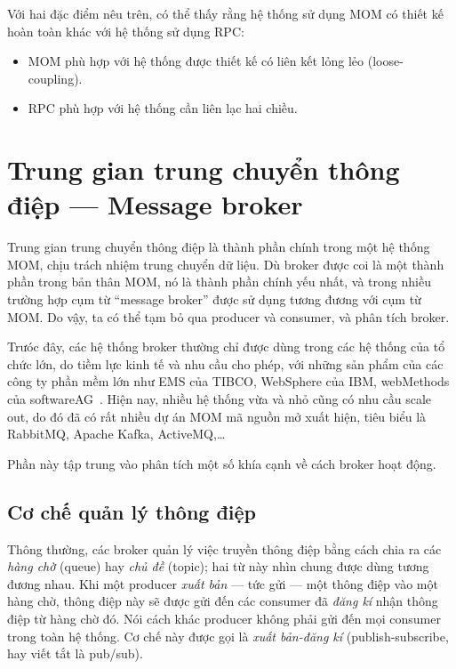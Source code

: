 \documentclass{article}
\begin{document}
Với hai đặc điểm nêu trên, có thể thấy rằng hệ thống sử dụng MOM có thiết kế
hoàn toàn khác với hệ thống sử dụng RPC\@:

\begin{itemize}
    \item MOM phù hợp với hệ thống được thiết kế có liên kết lỏng lẻo
        (loose-coupling).
    \item RPC phù hợp với hệ thống cần liên lạc hai chiều.
\end{itemize}

\section{Trung gian trung chuyển thông điệp --- Message broker}

Trung gian trung chuyển thông điệp là thành phần chính trong một hệ thống MOM,
chịu trách nhiệm trung chuyển dữ liệu. Dù broker được coi là một thành phần
trong bản thân MOM, nó là thành phần chính yếu nhất, và trong nhiều trường hợp
cụm từ ``message broker'' được sử dụng tương đương với cụm từ MOM\@. Do vậy, ta
có thể tạm bỏ qua producer và consumer, và phân tích broker.

Trưóc đây, các hệ thống broker thường chỉ được dùng trong các hệ thống của tổ
chức lớn, do tiềm lực kinh tế và nhu cầu cho phép, với những sản phẩm của các
công ty phần mềm lớn như EMS của TIBCO, WebSphere của IBM, webMethods của
softwareAG~\cite{Kleppmann17C}. Hiện nay, nhiều hệ thống vừa và nhỏ cũng có nhu
cầu scale out, do đó đã có rất nhiều dự án MOM mã nguồn mở xuất hiện, tiêu biểu
là RabbitMQ, Apache Kafka, ActiveMQ,\ldots

Phần này tập trung vào phân tích một số khía cạnh về cách broker hoạt động.

\subsection{Cơ chế quản lý thông điệp}

Thông thường, các broker quản lý việc truyền thông điệp bằng cách chia ra các
\emph{hàng chờ} (queue) hay \emph{chủ đề} (topic); hai từ này nhìn chung được
dùng tương đương nhau. Khi một producer \emph{xuất bản} --- tức gửi --- một
thông điệp vào một hàng chờ, thông điệp này sẽ được gửi đến các consumer đã
\emph{đăng kí} nhận thông điệp từ hàng chờ đó. Nói cách khác producer không phải
gửi đến mọi consumer trong toàn hệ thống. Cơ chế này được gọi là \emph{xuất
bản-đăng kí} (publish-subscribe, hay viết tắt là pub/sub).
\end{document}
